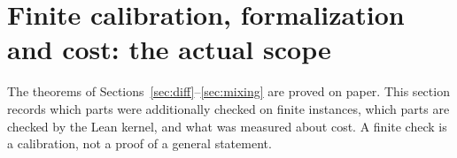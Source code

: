 \section{Finite calibration, formalization and cost: the actual scope}\label{sec:verif}

The theorems of Sections~\ref{sec:diff}--\ref{sec:mixing} are proved on paper. This section records
which parts were additionally checked on finite instances, which parts are checked by the Lean kernel,
and what was measured about cost. A finite check is a calibration, not a proof of a general statement.

